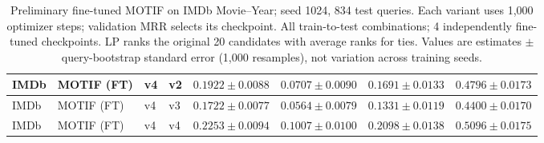 \begin{table}[htbp]
\begin{adjustbox}{max width=\linewidth}
\begin{tabular}{|l|l|l|l|l|l|l|l|}
\hline
IMDb & MOTIF (FT) & v4 & v2 & $0.1922 \pm 0.0088$ & $0.0707 \pm 0.0090$ & $0.1691 \pm 0.0133$ & $0.4796 \pm 0.0173$ \\
\hline
IMDb & MOTIF (FT) & v4 & v3 & $0.1722 \pm 0.0077$ & $0.0564 \pm 0.0079$ & $0.1331 \pm 0.0119$ & $0.4400 \pm 0.0170$ \\
\hline
IMDb & MOTIF (FT) & v4 & v4 & $0.2253 \pm 0.0094$ & $0.1007 \pm 0.0100$ & $0.2098 \pm 0.0138$ & $0.5096 \pm 0.0175$ \\
\hline
\end{tabular}
\end{adjustbox}
\caption{Preliminary fine-tuned MOTIF on IMDb Movie--Year; seed 1024, 834 test queries. Each variant uses 1,000 optimizer steps; validation MRR selects its checkpoint. All train-to-test combinations; 4 independently fine-tuned checkpoints. LP ranks the original 20 candidates with average ranks for ties. Values are estimates $\pm$ query-bootstrap standard error (1,000 resamples), not variation across training seeds.}
\label{tab:motif-imdb-movie-year-matrix-link_prediction-all}
\end{table}
